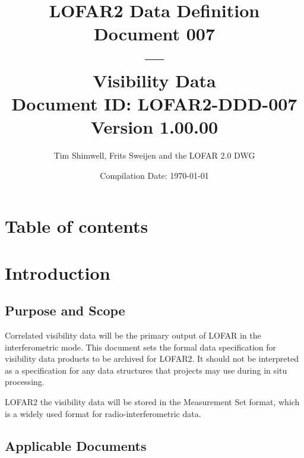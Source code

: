 \documentclass[a4paper,10pt,bibtotoc]{scrartcl}
\begin{document}

\title{LOFAR2 Data Definition Document 007 \\ --- \\ Visibility Data \\
{\normalsize Document ID: LOFAR2-DDD-007} \\ 
{\normalsize Version 1.00.00} \\
}
\author{Tim Shimwell, Frits Sweijen and the LOFAR 2.0 DWG}
\date{\small{Compilation Date: \today}}
\maketitle

\section{Table of contents}
\tableofcontents

\listoffigures

\listoftables

\clearpage




\section{Introduction}
\label{sec:introduction}

\subsection{Purpose and Scope}
\label{sec:purpose and scope}
Correlated visibility data will be the primary output of LOFAR in the interferometric mode. This document sets the formal data specification for visibility data products to be archived for LOFAR2. It should not be interpreted as a specification for any data structures that projects may use during in situ processing.

LOFAR2 the visibility data will be stored in the Measurement Set format, which is a widely used format for radio-interferometric data.

\subsection{Applicable Documents}
\end{document}
